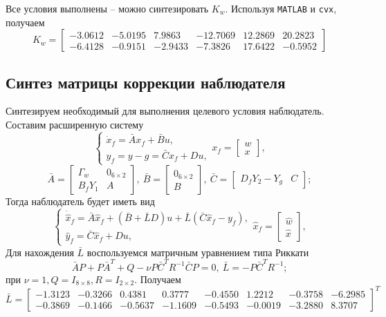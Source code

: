\documentclass[a4paper, 12pt]{article}
\begin{document}
    Все условия выполнены -- можно синтезировать $K_w$. Используя \texttt{MATLAB} и \texttt{cvx},
    получаем
    $$
    K_w=\begin{bmatrix}
    -3.0612   &-5.0195    &7.9863  &-12.7069   &12.2869   &20.2823\\
   -6.4128   &-0.9151   &-2.9433   &-7.3826   &17.6422   &-0.5952
    \end{bmatrix}
    $$


    \subsection{Синтез матрицы коррекции наблюдателя}
    Синтезируем необходимый для выполнения целевого условия наблюдатель.
    Составим расширенную систему
    $$
    \begin{cases}
    \dot{x}_f=\bar{A}x_f+\bar{B}u,\\
    y_f=y-g=\bar{C}x_f+Du,
    \end{cases} x_f=\begin{bmatrix}
        w\\x
    \end{bmatrix},
    $$
    $$
    \bar{A}=\begin{bmatrix}
        \Gamma_w &0_{6\times2}\\
        B_fY_1 &A
    \end{bmatrix},\ \bar{B}=\begin{bmatrix}
        0_{6\times2}\\B
    \end{bmatrix},\ \bar{C}=\begin{bmatrix}
        D_fY_2-Y_g &C
    \end{bmatrix};
    $$
    Тогда наблюдатель будет иметь вид
    $$
    \begin{cases}
    \dot{\hat{x}}_f=\bar{A}\hat{x}_f+\left( \bar{B}+\bar{L}D \right)u+\bar{L}\left( \bar{C}\hat{x}_f-y_f \right),\\
    \hat{y}_f=\bar{C}\hat{x}_f+Du,
    \end{cases} \hat{x}_f=\begin{bmatrix}
        \hat{w}\\\hat{x}
    \end{bmatrix},
    $$
    Для нахождения $\bar{L}$ воспользуемся матричным уравнением типа Риккати
    $$
    \bar{A}P+P\bar{A}^T+Q-\nu P\bar{C}^TR^{-1}\bar{C}P=0,\ \bar{L}=-P\bar{C}^TR^{-1};
    $$
    при $\nu=1,Q=I_{8\times8},R=I_{2\times2}$. Получаем
    $$
    \bar{L}=\begin{bmatrix}
    -1.3123   &-0.3266    &0.4381    &0.3777   &-0.4550    &1.2212   &-0.3758   &-6.2985\\
   -0.3869   &-0.1466   &-0.5637   &-1.1609   &-0.5493   &-0.0019   &-3.2880    &8.3707
    \end{bmatrix}^T
    $$
\end{document}
